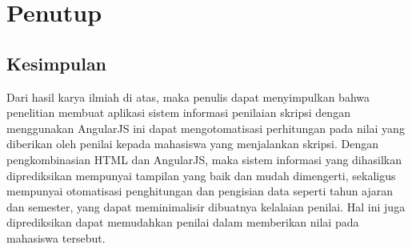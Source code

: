 \chapter{Penutup}
\label{chap: penutup}
	
\section{Kesimpulan}
\label{sec: kesimpulan}

	Dari hasil karya ilmiah di atas, maka penulis dapat menyimpulkan bahwa penelitian membuat aplikasi sistem informasi penilaian skripsi dengan menggunakan AngularJS ini dapat mengotomatisasi perhitungan pada nilai yang diberikan oleh penilai kepada mahasiswa yang menjalankan skripsi. Dengan pengkombinasian HTML dan AngularJS, maka sistem informasi yang dihasilkan diprediksikan mempunyai tampilan yang baik dan mudah dimengerti, sekaligus mempunyai otomatisasi penghitungan dan pengisian data seperti tahun ajaran dan semester, yang dapat meminimalisir dibuatnya kelalaian penilai. Hal ini juga diprediksikan dapat memudahkan penilai dalam memberikan nilai pada mahasiswa tersebut.